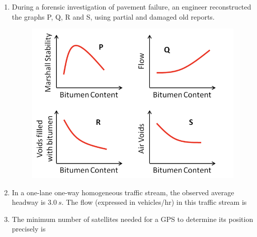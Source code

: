 \documentclass[journal]{IEEEtran}
\begin{document}
\begin{enumerate}[resume]
\item During a forensic investigation of pavement failure, an engineer reconstructed the graphs P, Q, R and S, using partial and damaged old reports. \hfill {}

\begin{figure}[H]
    \centering
    \includegraphics[width=0.6\columnwidth]{figs/Q31.png} 
    \caption{}
    \label{fig:placeholder}
\end{figure}

\begin{enumerate}
\end{enumerate}

\item In a one-lane one-way homogeneous traffic stream, the observed average headway is $3.0 \ s$. The flow (expressed in vehicles/hr) in this traffic stream is \hfill {}
\begin{enumerate}
\end{enumerate}

\item The minimum number of satellites needed for a GPS to determine its position precisely is \hfill {}
\begin{enumerate}
\end{enumerate}


\end{enumerate}
\end{document}
